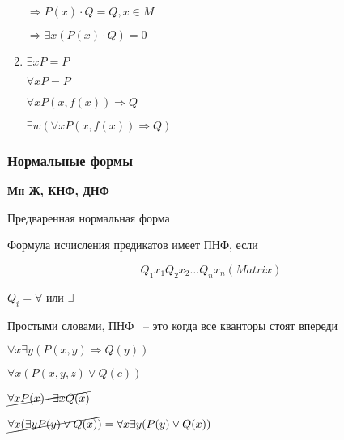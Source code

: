 \documentclass[russian]{lecture-notes}
\begin{document}
\begin{enumerate}
{            $\Rightarrow P(x) \cdot Q = Q, x \in M $

            $\Rightarrow \exists x (P(x) \cdot Q) = 0$

        }

        \item{
            $\exists x P = P$

            $\forall x P = P$

            \begin{example}
                $\forall x P(x, f(x)) \Rightarrow Q$

                $\exists w (\forall x P(x, f(x)) \Rightarrow Q)$
            \end{example}
        }

    \end{enumerate}

    \subsubsection{Нормальные формы}

    \textbf{Мн Ж, КНФ, ДНФ}

    \begin{definition}
        Предваренная нормальная форма

        Формула исчисления предикатов имеет ПНФ, если

        $$Q_1 x_1 Q_2 x_2 \dots Q_n x_n (  Matrix  )$$

        $Q_i = \forall$ или $\exists$

        Простыми словами, ПНФ ~-- это когда все кванторы стоят впереди
    \end{definition}

    \begin{example}
        $\forall x \exists y (P(x, y) \Rightarrow Q(y))$
    \end{example}

    \begin{example}
        $\forall x (P(x, y, z) \lor Q(c))$
    \end{example}

    \begin{example}
        $\cancel{\forall x P(x) \cdot \exists x Q(x)}$
    \end{example}

    \begin{example}
        $\cancel{\forall x (\exists y P(y) \lor Q(x))}  = \forall x \exists y (P(y) \lor Q(x))$
    \end{example}
\end{document}
